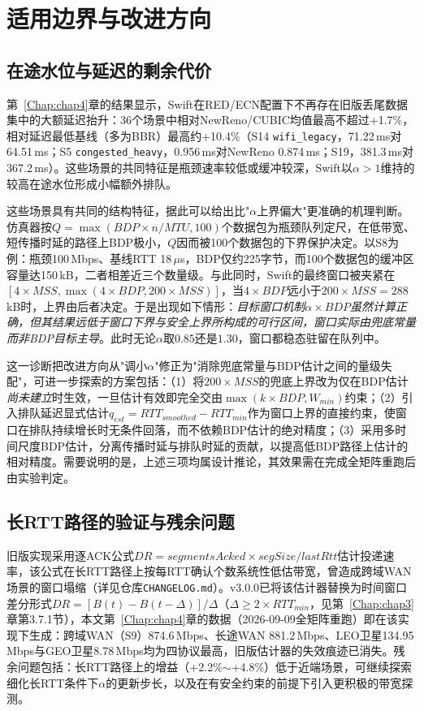 \section{适用边界与改进方向}
\label{sec:limitation-future}

\subsection{在途水位与延迟的剩余代价}

第~\ref{Chap:chap4}章的结果显示，Swift在RED/ECN配置下不再存在旧版丢尾数据集中的大额延迟抬升：36个场景中相对NewReno/CUBIC均值最高不超过+1.7\%，相对延迟最低基线（多为BBR）最高约+10.4\%（S14 \texttt{wifi\_legacy}，71.22\,ms对64.51\,ms；S5 \texttt{congested\_heavy}，0.956\,ms对NewReno 0.874\,ms；S19，381.3\,ms对367.2\,ms）。这些场景的共同特征是瓶颈速率较低或缓冲较深，Swift以$\alpha>1$维持的较高在途水位形成小幅额外排队。

这些场景具有共同的结构特征，据此可以给出比"$\alpha$上界偏大"更准确的机理判断。仿真器按$Q = \max(BDP \times n / MTU, 100)$个数据包为瓶颈队列定尺，在低带宽、短传播时延的路径上BDP极小，$Q$因而被100个数据包的下界保护决定。以S8为例：瓶颈100\,Mbps、基线RTT 18\,$\mu$s，BDP仅约225字节，而100个数据包的缓冲区容量达150\,kB，二者相差近三个数量级。与此同时，Swift的最终窗口被夹紧在$[4 \times MSS, \max(4 \times BDP, 200 \times MSS)]$，当$4 \times BDP$远小于$200 \times MSS = 288$\,kB时，上界由后者决定。于是出现如下情形：\emph{目标窗口机制$\alpha \times BDP$虽然计算正确，但其结果远低于窗口下界与安全上界所构成的可行区间，窗口实际由兜底常量而非BDP目标主导}。此时无论$\alpha$取$0.85$还是$1.30$，窗口都稳态驻留在队列中。

这一诊断把改进方向从"调小$\alpha$"修正为"消除兜底常量与BDP估计之间的量级失配"，可进一步探索的方案包括：（1）将$200 \times MSS$的兜底上界改为仅在BDP估计\emph{尚未建立}时生效，一旦估计有效即完全交由$\max(k \times BDP, W_{min})$约束；（2）引入排队延迟显式估计$q_{est} = RTT_{smoothed} - RTT_{min}$作为窗口上界的直接约束，使窗口在排队持续增长时无条件回落，而不依赖BDP估计的绝对精度；（3）采用多时间尺度BDP估计，分离传播时延与排队时延的贡献，以提高低BDP路径上估计的相对精度。需要说明的是，上述三项均属设计推论，其效果需在完成全矩阵重跑后由实验判定。

\subsection{长RTT路径的验证与残余问题}

旧版实现采用逐ACK公式$DR = segmentsAcked \times segSize / lastRtt$估计投递速率，该公式在长RTT路径上按每RTT确认个数系统性低估带宽，曾造成跨域WAN场景的窗口塌缩（详见仓库\texttt{CHANGELOG.md}）。v3.0.0已将该估计器替换为时间窗口差分形式$DR = [B(t) - B(t-\Delta)]/\Delta$（$\Delta \ge 2 \times RTT_{min}$，见第~\ref{Chap:chap3}章第3.7.1节），本文第~\ref{Chap:chap4}章的数据（2026-09-09全矩阵重跑）即在该实现下生成：跨域WAN（S9）874.6\,Mbps、长途WAN 881.2\,Mbps、LEO卫星134.95\,Mbps与GEO卫星8.78\,Mbps均为四协议最高，旧版估计器的失效痕迹已消失。残余问题包括：长RTT路径上的增益（+2.2\%$\sim$+4.8\%）低于近端场景，可继续探索细化长RTT条件下$\alpha$的更新步长，以及在有安全约束的前提下引入更积极的带宽探测。

